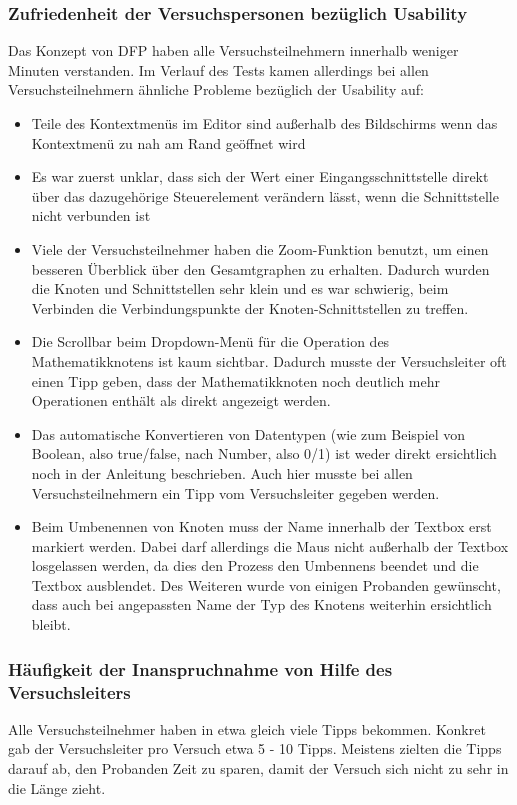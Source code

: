 \subsubsection{Zufriedenheit der Versuchspersonen bezüglich Usability}
Das Konzept von \ac{DFP} haben alle Versuchsteilnehmern innerhalb weniger Minuten verstanden. Im Verlauf des Tests kamen allerdings bei allen Versuchsteilnehmern ähnliche Probleme bezüglich der Usability auf:
\begin{itemize}
    \item Teile des Kontextmenüs im Editor sind außerhalb des Bildschirms wenn das Kontextmenü zu nah am Rand geöffnet wird
    \item Es war zuerst unklar, dass sich der Wert einer Eingangsschnittstelle direkt über das dazugehörige Steuerelement verändern lässt, wenn die Schnittstelle nicht verbunden ist
    \item Viele der Versuchsteilnehmer haben die Zoom-Funktion benutzt, um einen besseren Überblick über den Gesamtgraphen zu erhalten. Dadurch wurden die Knoten und Schnittstellen sehr klein und es war schwierig, beim Verbinden die Verbindungspunkte der Knoten-Schnittstellen zu treffen.
    \item Die Scrollbar beim Dropdown-Menü für die Operation des Mathematikknotens ist kaum sichtbar. Dadurch musste der Versuchsleiter oft einen Tipp geben, dass der Mathematikknoten noch deutlich mehr Operationen enthält als direkt angezeigt werden.
    \item Das automatische Konvertieren von Datentypen (wie zum Beispiel von Boolean, also true/false, nach Number, also 0/1) ist weder direkt ersichtlich noch in der Anleitung beschrieben. Auch hier musste bei allen Versuchsteilnehmern ein Tipp vom Versuchsleiter gegeben werden.
    \item Beim Umbenennen von Knoten muss der Name innerhalb der Textbox erst markiert werden. Dabei darf allerdings die Maus nicht außerhalb der Textbox losgelassen werden, da dies den Prozess den Umbennens beendet und die Textbox ausblendet. Des Weiteren wurde von einigen Probanden gewünscht, dass auch bei angepassten Name der Typ des Knotens weiterhin ersichtlich bleibt.
\end{itemize}

\subsubsection{Häufigkeit der Inanspruchnahme von Hilfe des Versuchsleiters}
Alle Versuchsteilnehmer haben in etwa gleich viele Tipps bekommen. Konkret gab der Versuchsleiter pro Versuch etwa 5 - 10 Tipps. Meistens zielten die Tipps darauf ab, den Probanden Zeit zu sparen, damit der Versuch sich nicht zu sehr in die Länge zieht.

